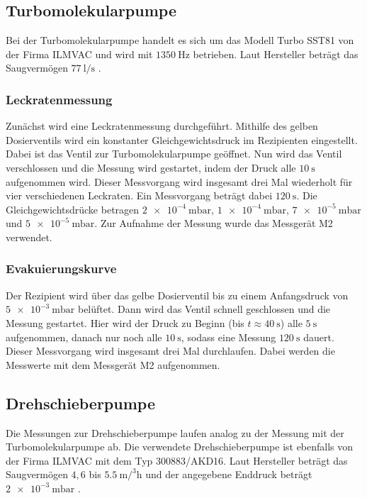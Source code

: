         \subsection{Turbomolekularpumpe}
            Bei der Turbomolekularpumpe handelt es sich um das Modell Turbo SST81 von der Firma ILMVAC und wird mit $\SI{1350}{\hertz}$ betrieben.
            Laut Hersteller beträgt das Saugvermögen $\SI{77}{\litre\per\second}$ \cite{anleitung}.

            \subsubsection{Leckratenmessung}
                Zunächst wird eine Leckratenmessung durchgeführt.
                Mithilfe des gelben Dosierventils wird ein konstanter Gleichgewichtsdruck im Rezipienten eingestellt.
                Dabei ist das Ventil zur Turbomolekularpumpe geöffnet.
                Nun wird das Ventil verschlossen und die Messung wird gestartet, indem der Druck alle $\SI{10}{\second}$ aufgenommen wird.
                Dieser Messvorgang wird insgesamt drei Mal wiederholt für vier verschiedenen Leckraten.
                Ein Messvorgang beträgt dabei $\SI{120}{\second}$.
                Die Gleichgewichtsdrücke betragen $\SI{2e-4}{\milli\bar}, \, \SI{1e-4}{\milli\bar}, \, \SI{7e-5}{\milli\bar}$ und $\SI{5e-5}{\milli\bar}$.
                Zur Aufnahme der Messung wurde das Messgerät M2 verwendet.

            \subsubsection{Evakuierungskurve}
                Der Rezipient wird über das gelbe Dosierventil bis zu einem Anfangsdruck von $\SI{5e-3}{\milli\bar}$ belüftet.
                Dann wird das Ventil schnell geschlossen und die Messung gestartet.
                Hier wird der Druck zu Beginn (bis $t \approx \SI{40}{\second}$) alle $\SI{5}{\second}$ aufgenommen, danach nur noch alle $\SI{10}{\second}$, sodass eine Messung $\SI{120}{\second}$ dauert.
                Dieser Messvorgang wird insgesamt drei Mal durchlaufen.
                Dabei werden die Messwerte mit dem Messgerät M2 aufgenommen.

        \subsection{Drehschieberpumpe}
            Die Messungen zur Drehschieberpumpe laufen analog zu der Messung mit der Turbomolekularpumpe ab.
            Die verwendete Drehschieberpumpe ist ebenfalls von der Firma ILMVAC mit dem Typ 300883/AKD16.
            Laut Hersteller beträgt das Saugvermögen $4,6$ bis $\SI{5.5}{\metre\cubic\per\hour}$ und der angegebene Enddruck beträgt $\SI{2e-3}{\milli\bar}$ \cite{anleitung}.

